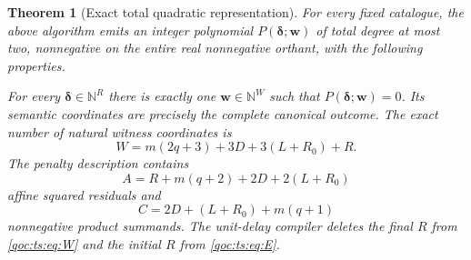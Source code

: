 \documentclass[11pt,letterpaper]{article}
\newtheorem{theorem}{Theorem}[section]
\theoremstyle{definition}
\theoremstyle{remark}
\newcommand{\N}{\mathbb N}
\begin{document}
\begin{theorem}[Exact total quadratic representation]\label{qoc:ts:thm:main}
For every fixed catalogue, the above algorithm emits an integer polynomial
$P(\boldsymbol\delta;\boldsymbol w)$ of total degree at most two,
nonnegative on the entire real nonnegative orthant, with the following
properties.

For every $\boldsymbol\delta\in\N^R$ there is exactly one
$\boldsymbol w\in\N^W$ such that $P(\boldsymbol\delta;\boldsymbol w)=0$.
Its semantic coordinates are precisely the complete canonical outcome.
The exact number of natural witness coordinates is
\begin{equation}\label{qoc:ts:eq:W}
 W=m(2q+3)+3D+3(L+R_0)+R.
\end{equation}
The penalty description contains
\begin{equation}\label{qoc:ts:eq:E}
 A=R+m(q+2)+2D+2(L+R_0)
\end{equation}
affine squared residuals and
\begin{equation}\label{qoc:ts:eq:C}
 C=2D+(L+R_0)+m(q+1)
\end{equation}
nonnegative product summands. The unit-delay compiler deletes the final
$R$ from \eqref{qoc:ts:eq:W} and the initial $R$ from \eqref{qoc:ts:eq:E}.
\end{theorem}
\end{document}

